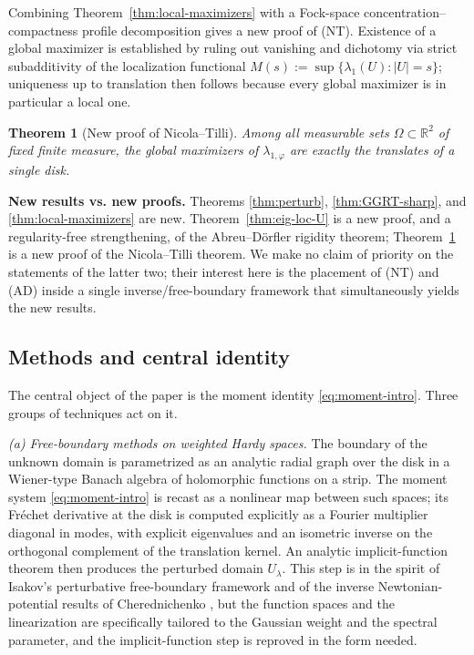\documentclass[a4paper,11pt,reqno]{amsart}
\numberwithin{equation}{section}
\theoremstyle{plain} %
\newtheorem{theorem}{Theorem}
\theoremstyle{definition} %
\theoremstyle{remark}
\newcommand{\R}{\mathbb{R}}
\begin{document}
Combining Theorem~\ref{thm:local-maximizers} with a Fock-space concentration--compactness profile decomposition gives a new proof of (NT). Existence of a global maximizer is established by ruling out vanishing and dichotomy via strict subadditivity of the localization functional $M(s):=\sup\{\lambda_1(U):|U|=s\}$; uniqueness up to translation then follows because every global maximizer is in particular a local one.

\begin{theorem}[New proof of Nicola--Tilli]\label{thm:NT-new}
Among all measurable sets $\Omega\subset\R^2$ of fixed finite measure, the global maximizers of $\lambda_{1,\varphi}$ are exactly the translates of a single disk.
\end{theorem}

\medskip

\noindent\textbf{New results vs. new proofs.}\enspace
Theorems \ref{thm:perturb}, \ref{thm:GGRT-sharp}, and \ref{thm:local-maximizers} are new. Theorem~\ref{thm:eig-loc-U} is a new proof, and a regularity-free strengthening, of the Abreu--D\"orfler rigidity theorem; Theorem~\ref{thm:NT-new} is a new proof of the Nicola--Tilli theorem. We make no claim of priority on the statements of the latter two; their interest here is the placement of (NT) and (AD) inside a single inverse/free-boundary framework that simultaneously yields the new results.

\subsection{Methods and central identity}\label{ssec:intro-methods}

The central object of the paper is the moment identity \eqref{eq:moment-intro}. Three groups of techniques act on it.

\smallskip
\noindent\emph{(a) Free-boundary methods on weighted Hardy spaces.}
The boundary of the unknown domain is parametrized as an analytic radial graph over the disk in a Wiener-type Banach algebra of holomorphic functions on a strip. The moment system \eqref{eq:moment-intro} is recast as a nonlinear map between such spaces; its Fr\'echet derivative at the disk is computed explicitly as a Fourier multiplier diagonal in modes, with explicit eigenvalues and an isometric inverse on the orthogonal complement of the translation kernel. An analytic implicit-function theorem then produces the perturbed domain $U_\lambda$. This step is in the spirit of Isakov's perturbative free-boundary framework \cite{Isakov} and of the inverse Newtonian-potential results of Cherednichenko \cite{Cherednichenko}, but the function spaces and the linearization are specifically tailored to the Gaussian weight and the spectral parameter, and the implicit-function step is reproved in the form needed.
\end{document}
